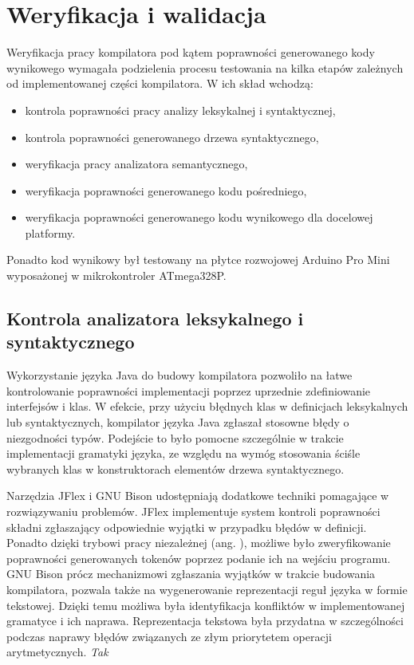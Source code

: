\chapter{Weryfikacja i walidacja}
\label{ch:06}
Weryfikacja pracy kompilatora pod kątem poprawności generowanego kody wynikowego wymagała podzielenia procesu testowania na kilka etapów zależnych od implementowanej części kompilatora. W ich skład wchodzą:
\begin{itemize}
\item kontrola poprawności pracy analizy leksykalnej i syntaktycznej,
\item kontrola poprawności generowanego drzewa syntaktycznego,
\item weryfikacja pracy analizatora semantycznego,
\item weryfikacja poprawności generowanego kodu pośredniego,
\item weryfikacja poprawności generowanego kodu wynikowego dla docelowej platformy.
\end{itemize}
Ponadto kod wynikowy był testowany na płytce rozwojowej Arduino Pro Mini wyposażonej w mikrokontroler ATmega328P.

\section{Kontrola analizatora leksykalnego i syntaktycznego}
Wykorzystanie języka Java do budowy kompilatora pozwoliło na łatwe kontrolowanie poprawności implementacji poprzez uprzednie zdefiniowanie interfejsów i klas. W efekcie, przy użyciu błędnych klas w definicjach leksykalnych lub syntaktycznych, kompilator języka Java zgłaszał stosowne błędy o niezgodności typów. Podejście to było pomocne szczególnie w trakcie implementacji gramatyki języka, ze względu na wymóg stosowania ściśle wybranych klas w konstruktorach elementów drzewa syntaktycznego.

Narzędzia JFlex i GNU Bison udostępniają dodatkowe techniki pomagające w rozwiązywaniu problemów. JFlex implementuje system kontroli poprawności składni zgłaszający odpowiednie wyjątki w przypadku błędów w definicji. Ponadto dzięki trybowi pracy niezależnej (ang. ), możliwe było zweryfikowanie poprawności generowanych tokenów poprzez podanie ich na wejściu programu.
GNU Bison prócz mechanizmowi zgłaszania wyjątków w trakcie budowania kompilatora, pozwala także na wygenerowanie reprezentacji reguł języka w formie tekstowej. Dzięki temu możliwa była identyfikacja konfliktów w implementowanej gramatyce i ich naprawa. Reprezentacja tekstowa była przydatna w szczególności podczas naprawy błędów związanych ze złym priorytetem operacji arytmetycznych.
 \textit{Tak} 

